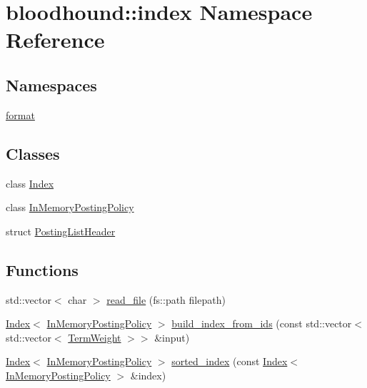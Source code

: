\hypertarget{namespacebloodhound_1_1index}{}\section{bloodhound\+:\+:index Namespace Reference}
\label{namespacebloodhound_1_1index}
\subsection*{Namespaces}
\begin{DoxyCompactItemize}
\item 
 \mbox{\hyperlink{namespacebloodhound_1_1index_1_1format}{format}}
\end{DoxyCompactItemize}
\subsection*{Classes}
\begin{DoxyCompactItemize}
\item 
class \mbox{\hyperlink{classbloodhound_1_1index_1_1Index}{Index}}
\item 
class \mbox{\hyperlink{classbloodhound_1_1index_1_1InMemoryPostingPolicy}{In\+Memory\+Posting\+Policy}}
\item 
struct \mbox{\hyperlink{structbloodhound_1_1index_1_1PostingListHeader}{Posting\+List\+Header}}
\end{DoxyCompactItemize}
\subsection*{Functions}
\begin{DoxyCompactItemize}
\item 
std\+::vector$<$ char $>$ \mbox{\hyperlink{namespacebloodhound_1_1index_a4b6f89a17c10bf2927aff24df7081bb3}{read\+\_\+file}} (fs\+::path filepath)
\item 
\mbox{\hyperlink{classbloodhound_1_1index_1_1Index}{Index}}$<$ \mbox{\hyperlink{classbloodhound_1_1index_1_1InMemoryPostingPolicy}{In\+Memory\+Posting\+Policy}} $>$ \mbox{\hyperlink{namespacebloodhound_1_1index_ac508959a4f3ab5ce65d62f1c294359e2}{build\+\_\+index\+\_\+from\+\_\+ids}} (const std\+::vector$<$ std\+::vector$<$ \mbox{\hyperlink{structbloodhound_1_1TermWeight}{Term\+Weight}} $>$$>$ \&input)
\item 
\mbox{\hyperlink{classbloodhound_1_1index_1_1Index}{Index}}$<$ \mbox{\hyperlink{classbloodhound_1_1index_1_1InMemoryPostingPolicy}{In\+Memory\+Posting\+Policy}} $>$ \mbox{\hyperlink{namespacebloodhound_1_1index_a306f62c55e8d06a9703f552f7cf312c5}{sorted\+\_\+index}} (const \mbox{\hyperlink{classbloodhound_1_1index_1_1Index}{Index}}$<$ \mbox{\hyperlink{classbloodhound_1_1index_1_1InMemoryPostingPolicy}{In\+Memory\+Posting\+Policy}} $>$ \&index)
\end{DoxyCompactItemize}



